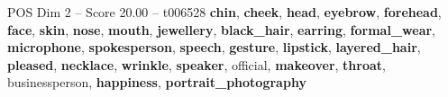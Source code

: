 \begin{textsample}{POS Dim 2 – Score 20.00 – t006528}  \label{ex:f2_pos_034}
\textbf{chin}, \textbf{cheek}, \textbf{head}, \textbf{eyebrow}, \textbf{forehead}, \textbf{face}, \textbf{skin}, \textbf{nose}, \textbf{mouth}, \textbf{jewellery}, \textbf{black\_hair}, \textbf{earring}, \textbf{formal\_wear}, \textbf{microphone}, \textbf{spokesperson}, \textbf{speech}, \textbf{gesture}, \textbf{lipstick}, \textbf{layered\_hair}, \textbf{pleased}, \textbf{necklace}, \textbf{wrinkle}, \textbf{speaker}, official, \textbf{makeover}, \textbf{throat}, businessperson, \textbf{happiness}, \textbf{portrait\_photography}

\end{textsample}
